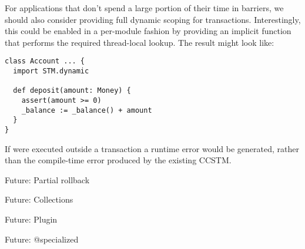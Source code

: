 For applications that don't spend a large portion of their time in barriers, we
should also consider providing full dynamic scoping for transactions.
Interestingly, this could be enabled in a per-module fashion by providing an
implicit function that performs the required thread-local lookup.  The result
might look like:
\lstset{numbers=none}
\begin{lstlisting}
class Account ... {
  import STM.dynamic

  def deposit(amount: Money) {
    assert(amount >= 0)
    _balance := _balance() + amount
  }
}
\end{lstlisting}
\lstset{numbers=left}
If  were executed outside a transaction a runtime error would be
generated, rather than the compile-time error produced by the existing CCSTM.

Future: Partial rollback

Future: Collections

Future: Plugin

Future: @specialized

\color{black}
